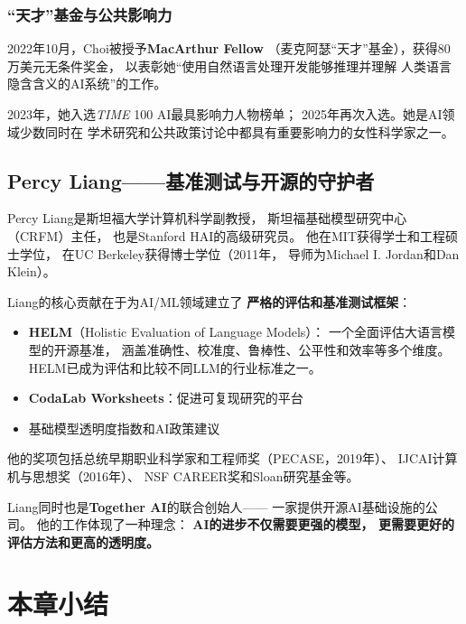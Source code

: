 \subsubsection{``天才''基金与公共影响力}
2022年10月，Choi被授予\textbf{MacArthur Fellow}
（麦克阿瑟``天才''基金），获得80万美元无条件奖金，
以表彰她``使用自然语言处理开发能够推理并理解
人类语言隐含含义的AI系统''的工作。

2023年，她入选\textit{TIME} 100 AI最具影响力人物榜单；
2025年再次入选。她是AI领域少数同时在
学术研究和公共政策讨论中都具有重要影响力的女性科学家之一。

\bigskip

\subsection{Percy Liang——基准测试与开源的守护者}
\label{sec:percy-liang}

Percy Liang是斯坦福大学计算机科学副教授，
斯坦福基础模型研究中心（CRFM）主任，
也是Stanford HAI的高级研究员。
他在MIT获得学士和工程硕士学位，
在UC Berkeley获得博士学位（2011年，
导师为Michael I. Jordan和Dan Klein）。

Liang的核心贡献在于为AI/ML领域建立了
\textbf{严格的评估和基准测试框架}：
\begin{itemize}[noitemsep]
  \item \textbf{HELM}（Holistic Evaluation of Language Models）：
    一个全面评估大语言模型的开源基准，
    涵盖准确性、校准度、鲁棒性、公平性和效率等多个维度。
    HELM已成为评估和比较不同LLM的行业标准之一。
  \item \textbf{CodaLab Worksheets}：促进可复现研究的平台
  \item 基础模型透明度指数和AI政策建议
\end{itemize}

他的奖项包括总统早期职业科学家和工程师奖（PECASE，2019年）、
IJCAI计算机与思想奖（2016年）、
NSF CAREER奖和Sloan研究基金等。

Liang同时也是\textbf{Together AI}的联合创始人——
一家提供开源AI基础设施的公司。
他的工作体现了一种理念：
\textbf{AI的进步不仅需要更强的模型，
更需要更好的评估方法和更高的透明度。}


\section{本章小结}
\label{sec:pioneers-summary}


